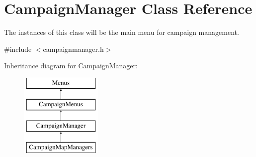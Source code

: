 \hypertarget{class_campaign_manager}{}\section{Campaign\+Manager Class Reference}
\label{class_campaign_manager}


The instances of this class will be the main menu for campaign management.  




{\ttfamily \#include $<$campaignmanager.\+h$>$}

Inheritance diagram for Campaign\+Manager\+:\begin{figure}[H]
\begin{center}
\leavevmode
\includegraphics[height=4.000000cm]{class_campaign_manager}
\end{center}
\end{figure}
